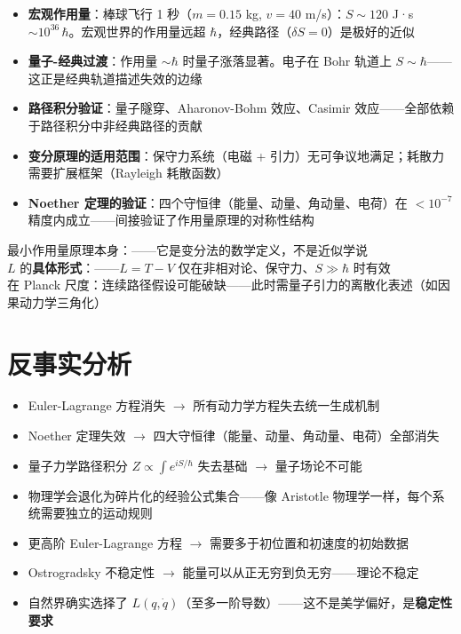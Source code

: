 \begin{oombox}
  \begin{itemize}
    \item \textbf{宏观作用量}：棒球飞行 1 秒（$m=0.15$ kg, $v=40$ m/s）：$S \sim 120$ J·s $\sim 10^{36}\,\hbar$。宏观世界的作用量远超 $\hbar$，经典路径（$\delta S=0$）是极好的近似
    \item \textbf{量子-经典过渡}：作用量 $\sim \hbar$ 时量子涨落显著。电子在 Bohr 轨道上 $S \sim \hbar$——这正是经典轨道描述失效的边缘
    \item \textbf{路径积分验证}：量子隧穿、Aharonov-Bohm 效应、Casimir 效应——全部依赖于路径积分中非经典路径的贡献
    \item \textbf{变分原理的适用范围}：保守力系统（电磁 + 引力）无可争议地满足；耗散力需要扩展框架（Rayleigh 耗散函数）
    \item \textbf{Noether 定理的验证}：四个守恒律（能量、动量、角动量、电荷）在 $<10^{-7}$ 精度内成立——间接验证了作用量原理的对称性结构
  \end{itemize}
\end{oombox}

\precisionbox[R2 精度等级]
  最小作用量原理本身：\precexact ——它是变分法的数学定义，不是近似学说\\
  $L$ 的\textbf{具体形式}：\preceffective ——$L = T-V$ 仅在非相对论、保守力、$S \gg \hbar$ 时有效\\
  在 Planck 尺度：连续路径假设可能破缺——此时需量子引力的离散化表述（如因果动力学三角化）
\endprecisionbox

\section*{反事实分析}

\begin{limitbox}[若无最小作用量原理]
  \begin{itemize}
    \item Euler-Lagrange 方程消失 $\to$ 所有动力学方程失去统一生成机制
    \item Noether 定理失效 $\to$ 四大守恒律（能量、动量、角动量、电荷）全部消失
    \item 量子力学路径积分 $Z \propto \int e^{iS/\hbar}$ 失去基础 $\to$ 量子场论不可能
    \item 物理学会退化为碎片化的经验公式集合——像 Aristotle 物理学一样，每个系统需要独立的运动规则
  \end{itemize}
\end{limitbox}

\begin{limitbox}[若 $L$ 不是 $T-V$ 形式（如含更高阶导数）]
  \begin{itemize}
    \item 更高阶 Euler-Lagrange 方程 $\to$ 需要多于初位置和初速度的初始数据
    \item Ostrogradsky 不稳定性 $\to$ 能量可以从正无穷到负无穷——理论不稳定
    \item 自然界确实选择了 $L(q,\dot{q})$（至多一阶导数）——这不是美学偏好，是\textbf{稳定性要求}
  \end{itemize}
\end{limitbox}
